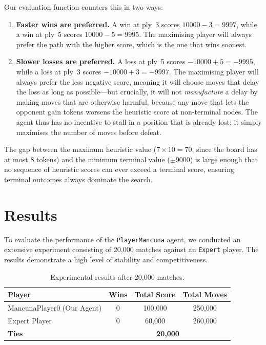 \documentclass[12pt,a4paper]{article}
\begin{document}
Our evaluation function counters this in two ways:

\begin{enumerate}
    \item \textbf{Faster wins are preferred.} A win at ply~3 scores $10000 - 3 = 9997$, while a win at ply~5 scores $10000 - 5 = 9995$. The maximising player will always prefer the path with the higher score, which is the one that wins soonest.

    \item \textbf{Slower losses are preferred.} A loss at ply~5 scores $-10000 + 5 = -9995$, while a loss at ply~3 scores $-10000 + 3 = -9997$. The maximising player will always prefer the less negative score, meaning it will choose moves that delay the loss as long as possible---but crucially, it will not \emph{manufacture} a delay by making moves that are otherwise harmful, because any move that lets the opponent gain tokens worsens the heuristic score at non-terminal nodes. The agent thus has no incentive to stall in a position that is already lost; it simply maximises the number of moves before defeat.
\end{enumerate}

The gap between the maximum heuristic value ($7 \times 10 = 70$, since the board has at most 8 tokens) and the minimum terminal value ($\pm 9000$) is large enough that no sequence of heuristic scores can ever exceed a terminal score, ensuring terminal outcomes always dominate the search.

\section{Results}
To evaluate the performance of the \texttt{PlayerMancuna} agent, we conducted an extensive experiment consisting of 20,000 matches against an \texttt{Expert} player. The results demonstrate a high level of stability and competitiveness.

\begin{table}[h]
    \centering
    \begin{tabular}{|l|c|c|c|}
        \hline
        \textbf{Player} & \textbf{Wins} & \textbf{Total Score} & \textbf{Total Moves} \\
        \hline
        MancunaPlayer0 (Our Agent) & 0 & 100,000 & 250,000 \\
        Expert Player & 0 & 60,000 & 260,000 \\
        \hline
        \textbf{Ties} & \multicolumn{3}{c|}{\textbf{20,000}} \\
        \hline
    \end{tabular}
    \caption{Experimental results after 20,000 matches.}
    \label{tab:results}
\end{table}
\end{document}

